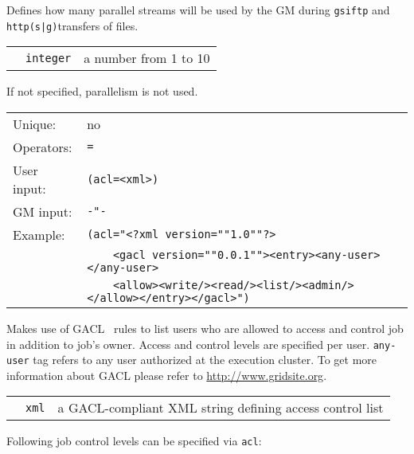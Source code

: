   Defines how many parallel streams will be used by the GM during
  \texttt{gsiftp} and \texttt{http(s|g)}transfers of files.

  \begin{tabular}{llp{10cm}}
    \hspace*{1cm}&\texttt{integer} & a number from 1 to 10\\
  \end{tabular}

  If not specified, parallelism is not used.

  \hspace*{0.5cm}
  \begin{shaded}
  \end{shaded}

  \begin{tabular}{lp{13cm}}
    Unique:&no\\
    Operators:&\verb#=#\\
    User input:&\verb#(acl=<xml>)#\\
    GM input:&\verb#-"-#\\
    Example:&\verb#(acl="<?xml version=""1.0""?>#\\
    &\verb#    <gacl version=""0.0.1""><entry><any-user></any-user>#\\
    &\verb#    <allow><write/><read/><list/><admin/></allow></entry></gacl>")#\\
  \end{tabular}



  Makes use of GACL~\cite{gacl} rules to list users who are allowed to
  access and control job in addition to job's owner. Access and
  control levels are specified per user. \texttt{any-user} tag refers
  to any user authorized at the execution cluster. To get more
  information about GACL please refer to \url{http://www.gridsite.org}.

  \begin{tabular}{llp{10cm}}
    \hspace*{1cm}&\texttt{xml} & a GACL-compliant XML string defining
    access control list\\
  \end{tabular}

  Following job control levels can be specified via \texttt{acl}:

